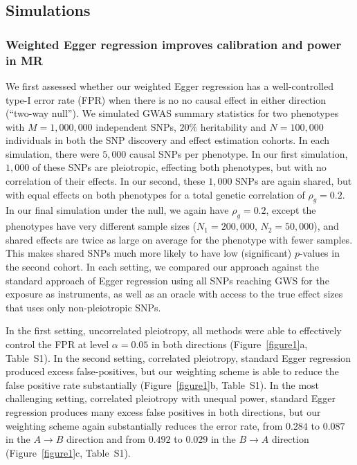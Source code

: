\documentclass{article}
\begin{document}
\subsection*{Simulations}
\subsubsection*{Weighted Egger regression improves calibration and power in MR}
We first assessed whether our weighted Egger regression
has a well-controlled type-I error rate (FPR) when there is no no causal effect in either direction (``two-way null''). We simulated GWAS summary statistics for two phenotypes with $M=1,000,000$
independent SNPs, $20\%$ heritability and $N = 100,000$ individuals in both
 the SNP discovery and effect estimation cohorts. In each simulation, there
 were $5,000$ causal
SNPs per phenotype. In our first simulation, $1,000$ of these SNPs are pleiotropic,
effecting both phenotypes, but with no correlation of their effects. In our
second, these $1,000$ SNPs are again shared, but with equal effects on both phenotypes
for a total genetic correlation of $\rho_g = 0.2$. In our final simulation under the
null, we again have $\rho_g = 0.2$, except the phenotypes have very different sample sizes
($N_1 = 200,000$, $N_2 = 50,000$), and shared effects are twice as large on average
for the phenotype with fewer samples. This makes shared SNPs much more likely to have
low (significant) $p$-values in the second cohort. In each setting, we compared our approach
against the standard approach of Egger regression using all SNPs reaching GWS for
 the exposure as instruments, as well as an oracle with access to the true
effect sizes that uses only non-pleiotropic SNPs.

In the first setting, uncorrelated pleiotropy, all methods were able to 
effectively control the FPR at level $\alpha = 0.05$ in both directions
(Figure~\ref{figure1}a, Table~S1).
In the second setting, correlated pleiotropy,
standard Egger regression produced excess false-positives, but our weighting
scheme is able to reduce the false positive rate substantially
(Figure~\ref{figure1}b, Table~S1).  In the most challenging setting,
correlated pleiotropy with unequal power, standard Egger regression produces
many excess false positives in both directions, but our weighting scheme
again substantially reduces the error rate, from $0.284$ to $0.087$ in
the $A\rightarrow B$ direction and from $0.492$ to $0.029$ in the 
$B\rightarrow A$ direction (Figure~\ref{figure1}c, Table~S1).
\end{document}
